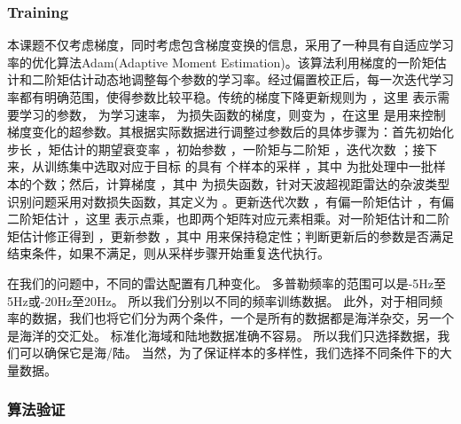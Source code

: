 \subsubsection{Training}
本课题不仅考虑梯度，同时考虑包含梯度变换的信息，采用了一种具有自适应学习率的优化算法Adam(Adaptive Moment Estimation)。该算法利用梯度的一阶矩估计和二阶矩估计动态地调整每个参数的学习率。经过偏置校正后，每一次迭代学习率都有明确范围，使得参数比较平稳。传统的梯度下降更新规则为 ，这里 表示需要学习的参数， 为学习速率， 为损失函数的梯度，则变为  ，在这里 是用来控制梯度变化的超参数。其根据实际数据进行调整过参数后的具体步骤为：首先初始化步长  ，矩估计的期望衰变率 ，初始参数 ，一阶矩与二阶矩  ，迭代次数 ；接下来，从训练集中选取对应于目标 的具有 个样本的采样 ，其中 为批处理中一批样本的个数；然后，计算梯度 ，其中 为损失函数，针对天波超视距雷达的杂波类型识别问题采用对数损失函数，其定义为 。更新迭代次数 ，有偏一阶矩估计 ，有偏二阶矩估计 ，这里 表示点乘，也即两个矩阵对应元素相乘。对一阶矩估计和二阶矩估计修正得到 ，更新参数 ，其中 用来保持稳定性；判断更新后的参数是否满足结束条件，如果不满足，则从采样步骤开始重复迭代执行。



在我们的问题中，不同的雷达配置有几种变化。 多普勒频率的范围可以是-5Hz至5Hz或-20Hz至20Hz。 所以我们分别以不同的频率训练数据。 此外，对于相同频率的数据，我们也将它们分为两个条件，一个是所有的数据都是海洋杂交，另一个是海洋的交汇处。 标准化海域和陆地数据准确不容易。 所以我们只选择数据，我们可以确保它是海/陆。 当然，为了保证样本的多样性，我们选择不同条件下的大量数据。
\subsubsection{算法验证}

